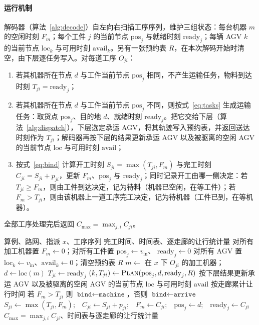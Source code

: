 \documentclass[manuscript,screen,review]{acmart}
\begin{document}
\paragraph{运行机制}
解码器（算法~\ref{alg:decode}）自左向右扫描工序序列，维护三组状态：每台机器 $m$ 的空闲时刻 $F_m$；每个工件 $j$ 的当前节点 $\mathrm{pos}_j$ 与就绪时刻 $\mathrm{ready}_j$；每辆 AGV $k$ 的当前节点 $\mathrm{loc}_k$ 与可用时刻 $\mathrm{avail}_k$。另有一张预约表 $R$，在本次解码开始时清空，由下层逐任务写入。对每道工序 $O_{ji}$：
\begin{enumerate}[label=(\arabic*),leftmargin=*,topsep=2pt,itemsep=1pt]
  \item 若其机器所在节点 $d$ 与工件当前节点 $\mathrm{pos}_j$ 相同，不产生运输任务，物料到达时刻 $T_{ji}=\mathrm{ready}_j$；
  \item 若其机器所在节点 $d$ 与工件当前节点 $\mathrm{pos}_j$ 不同，则按式~\eqref{eq:tasks} 生成运输任务：取货点 $\mathrm{pos}_j$、目的地 $d$、就绪时刻 $\mathrm{ready}_j$。把它交给下层（算法~\ref{alg:dispatch}），下层选定承运 AGV，将其轨迹写入预约表，并返回送达时刻作为 $T_{ji}$；解码器再按下层的结果更新承运 AGV 以及被驱离的空闲 AGV 的当前节点 $\mathrm{loc}$ 与可用时刻 $\mathrm{avail}$；
  \item 按式~\eqref{eq:bind} 计算开工时刻 $S_{ji}=\max(T_{ji},F_m)$ 与完工时刻 $C_{ji}=S_{ji}+p_{ji}$，更新 $F_m$、$\mathrm{pos}_j$ 与 $\mathrm{ready}_j$；同时记录开工由哪一侧决定：若 $T_{ji}\ge F_m$，则由工件到达决定，记为待料（机器已空闲，在等工件）；若 $F_m>T_{ji}$，则由该机器上一道工序完工决定，记为待机器（工件已到，在等机器）。
\end{enumerate}
全部工序处理完后返回 $C_{\max}=\max_{j,i}C_{ji}$。

\begin{algorithm}[t]
\caption{\textsc{Decode}：以完整无冲突仿真作为适应度}
\label{alg:decode}
\small
\begin{algorithmic}[1]
\Require 算例、路网、指派 $x$、工序序列
\Ensure 完工时间、时间表、逐走廊的让行统计量
\State 对所有加工机器置 $F_m\gets 0$；对所有工件置 $\mathrm{pos}_j\gets v_{\mathrm{in}}$、
       $\mathrm{ready}_j\gets 0$
\State 对所有 AGV 置 $\mathrm{loc}_k\gets v_{\mathrm{in}}$、$\mathrm{avail}_k\gets 0$；清空预约表 $R$
  \State $m\gets$ 在 $x$ 下 $O_{ji}$ 的加工机器；$d\gets \mathrm{loc}(m)$
     \State $T_{ji}\gets \mathrm{ready}_j$ 
  \Else
     \State $(k,T_{ji})\gets\textsc{Plan}(\mathrm{pos}_j,d,\mathrm{ready}_j,R)$
     \State 按下层结果更新承运 AGV 以及被驱离的空闲 AGV 的当前节点 $\mathrm{loc}$ 与可用时刻 $\mathrm{avail}$
     \State 按走廊累计让行时间
  \EndIf
  \State 若 $F_m>T_{ji}$ 则 $\texttt{bind}\gets\texttt{machine}$，否则
         $\texttt{bind}\gets\texttt{arrive}$ 
  \State $S_{ji}\gets\max(T_{ji},F_m)$;\ \ $C_{ji}\gets S_{ji}+p_{ji}$;\ \
         $F_m\gets C_{ji}$;\ \ $\mathrm{pos}_j\gets d$;\ \
         $\mathrm{ready}_j\gets C_{ji}$
\EndFor
\State \Return $C_{\max}=\max_{j,i} C_{ji}$、时间表与逐走廊的让行统计量
\end{algorithmic}
\end{algorithm}
\end{document}
